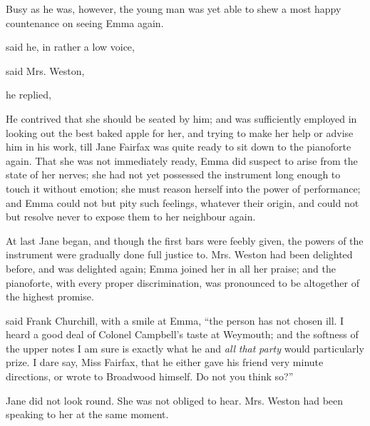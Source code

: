 Busy as he was, however, the young man was yet able to shew a most happy countenance on seeing Emma again.

 said he, in rather a low voice, 

 said Mrs. Weston, 

 he replied, 

He contrived that she should be seated by him; and was sufficiently employed in looking out the best baked apple for her, and trying to make her help or advise him in his work, till Jane Fairfax was quite ready to sit down to the pianoforte again. That she was not immediately ready, Emma did suspect to arise from the state of her nerves; she had not yet possessed the instrument long enough to touch it without emotion; she must reason herself into the power of performance; and Emma could not but pity such feelings, whatever their origin, and could not but resolve never to expose them to her neighbour again.

At last Jane began, and though the first bars were feebly given, the powers of the instrument were gradually done full justice to. Mrs. Weston had been delighted before, and was delighted again; Emma joined her in all her praise; and the pianoforte, with every proper discrimination, was pronounced to be altogether of the highest promise.

 said Frank Churchill, with a smile at Emma, “the person has not chosen ill. I heard a good deal of Colonel Campbell's taste at Weymouth; and the softness of the upper notes I am sure is exactly what he and {\em all} {\em that} {\em party} would particularly prize. I dare say, Miss Fairfax, that he either gave his friend very minute directions, or wrote to Broadwood himself. Do not you think so?”

Jane did not look round. She was not obliged to hear. Mrs. Weston had been speaking to her at the same moment.

